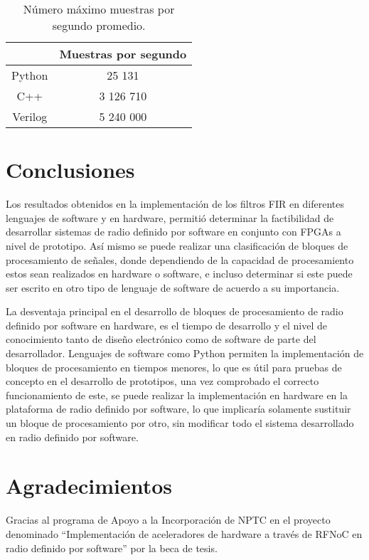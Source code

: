 \documentclass[12pt]{difu100cia} %
\begin{document}
\begin{table}[htb!]
\centering
\caption{Número máximo muestras por segundo promedio.} 
\begin{tabular}{cc} 
\toprule
       & Muestras por segundo \\ 
 \midrule
 Python  & 25 131 \\ 
 C++     & 3 126 710 \\ 
 Verilog & 5 240 000 \\ 
\bottomrule
\end{tabular}
\label{tabla_mues_max}
\end{table}

\section{Conclusiones}
\label{conclusiones}
Los resultados obtenidos en la implementación de los filtros FIR en diferentes lenguajes de software y en hardware, permitió determinar la factibilidad de desarrollar sistemas de radio definido por software en conjunto con FPGAs a nivel de prototipo. Así mismo se puede realizar una clasificación de bloques de procesamiento de señales, donde dependiendo de la capacidad de procesamiento estos sean realizados en hardware o software, e incluso determinar si este puede ser escrito en otro tipo de lenguaje de software de acuerdo a su importancia.

La desventaja principal en el desarrollo de bloques de procesamiento de radio definido por software en hardware, es el tiempo de desarrollo y el nivel de conocimiento tanto de diseño electrónico como de software de parte del desarrollador. Lenguajes de software como Python permiten la implementación de bloques de procesamiento en tiempos menores, lo que es útil para pruebas de concepto en el desarrollo de prototipos, una vez comprobado el correcto funcionamiento de este, se puede realizar la implementación en hardware en la plataforma de radio definido por software, lo que implicaría solamente sustituir un bloque de procesamiento por otro, sin modificar todo el sistema desarrollado en radio definido por software.

\section*{Agradecimientos}
\label{agradecimientos}

Gracias al programa de Apoyo a la Incorporación de NPTC en el proyecto denominado ``Implementación de aceleradores de hardware a través de RFNoC en radio definido por software'' por la beca de tesis.



\printbibliography

\end{document}
